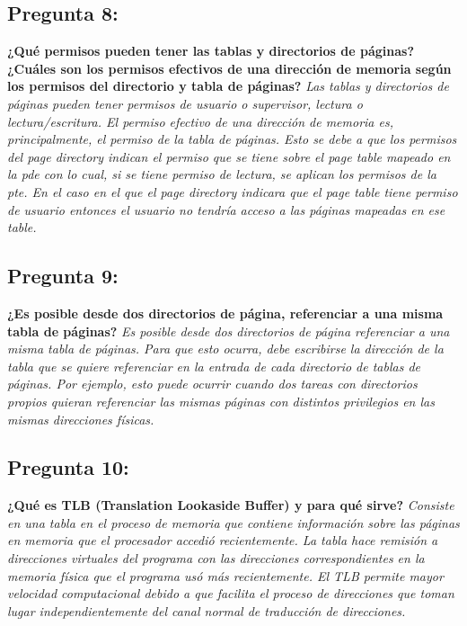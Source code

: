 \documentclass[10pt, a4paper]{article}
\begin{document}
{\subsection{Pregunta 8:}} \textbf{¿Qué permisos pueden tener las tablas y directorios de páginas? ¿Cuáles son los permisos efectivos de una dirección de memoria según los permisos del directorio y tabla de páginas?}\newline
\newline
\textit{Las tablas y directorios de páginas pueden tener permisos de usuario o supervisor, lectura o lectura/escritura. El permiso efectivo de una dirección de memoria es, principalmente, el permiso de la tabla de páginas. Esto se debe a que los permisos del page directory indican el permiso que se tiene sobre el page table mapeado en la pde con lo cual, si se tiene permiso de lectura, se aplican los permisos de la pte. En el caso en el que el page directory indicara que el page table tiene permiso de usuario entonces el usuario no tendría acceso a las páginas mapeadas en ese table.}

{\subsection{Pregunta 9:}} \textbf{¿Es posible desde dos directorios de página, referenciar a una misma tabla de páginas?}\newline
\newline
\textit{Es posible desde dos directorios de página referenciar a una misma tabla de páginas. Para que esto ocurra, debe escribirse la dirección de la tabla que se quiere referenciar en la entrada de cada directorio de tablas de páginas. Por ejemplo, esto puede ocurrir cuando dos tareas con directorios propios quieran referenciar las mismas páginas con distintos privilegios en las mismas direcciones físicas.}

{\subsection{Pregunta 10:}} \textbf{¿Qué es TLB (Translation Lookaside Buffer) y para qué sirve?}\newline
\newline
\textit{Consiste en una tabla en el proceso de memoria que contiene información sobre las páginas en memoria que el procesador accedió recientemente. La tabla hace remisión a direcciones virtuales del programa con las direcciones correspondientes en la memoria física que el programa usó más recientemente. El TLB permite mayor velocidad computacional debido a que facilita el proceso de direcciones que toman lugar independientemente del canal normal de traducción de direcciones.}
\end{document}

